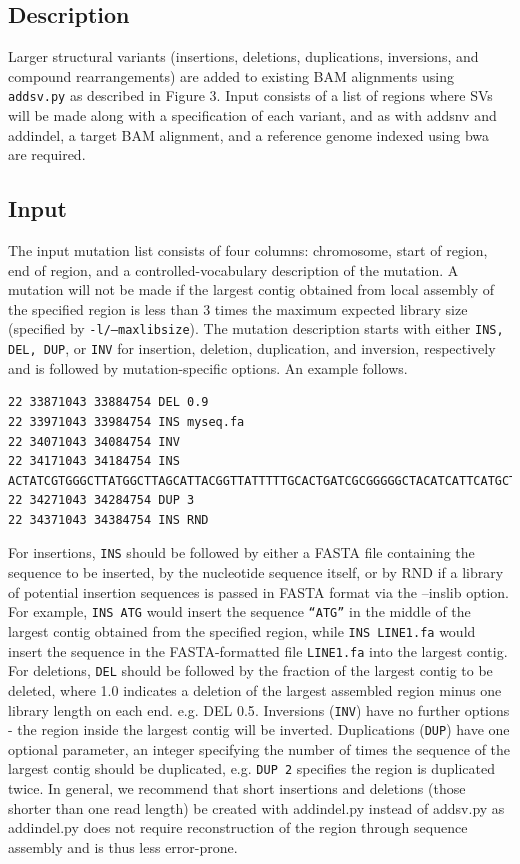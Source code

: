 \documentclass[letterpaper,11pt]{article}
\begin{document}
\subsection{Description}
   Larger structural variants (insertions, deletions, duplications, inversions, and compound rearrangements) are added to existing BAM alignments using \texttt{addsv.py} as described in Figure 3. Input consists of a list of regions where SVs will be made along with a specification of each variant, and as with addsnv and addindel, a target BAM alignment, and a reference genome indexed using bwa are required.

\subsection{Input}
    The input mutation list consists of four columns: chromosome, start of region, end of region, and a controlled-vocabulary description of the mutation. A mutation will not be made if the largest contig obtained from local assembly of the specified region is less than 3 times the maximum expected library size (specified by \texttt{-l/--maxlibsize}). The mutation description starts with either \texttt{INS, DEL, DUP}, or \texttt{INV} for insertion, deletion, duplication, and inversion, respectively and is followed by mutation-specific options. An example follows.

\begin{verbatim}
22 33871043 33884754 DEL 0.9
22 33971043 33984754 INS myseq.fa
22 34071043 34084754 INV
22 34171043 34184754 INS ACTATCGTGGGCTTATGGCTTAGCATTACGGTTATTTTTGCACTGATCGCGGGGGCTACATCATTCATGCTATTACTTGCGTATCGTA
22 34271043 34284754 DUP 3
22 34371043 34384754 INS RND
\end{verbatim}

    For insertions, \texttt{INS} should be followed by either a FASTA file containing the sequence to be inserted, by the nucleotide sequence itself, or by RND if a library of potential insertion sequences is passed in FASTA format via the --inslib option. For example, \texttt{INS ATG} would insert the sequence \texttt{``ATG''} in the middle of the largest contig obtained from the specified region, while \texttt{INS LINE1.fa} would insert the sequence in the FASTA-formatted file \texttt{LINE1.fa} into the largest contig. For deletions, \texttt{DEL} should be followed by the fraction of the largest contig to be deleted, where 1.0 indicates a deletion of the largest assembled region minus one library length on each end. e.g. {DEL 0.5}. Inversions (\texttt{INV}) have no further options - the region inside the largest contig will be inverted. Duplications (\texttt{DUP}) have one optional parameter, an integer specifying the number of times the sequence of the largest contig should be duplicated, e.g. \texttt{DUP 2} specifies the region is duplicated twice. In general, we recommend that short insertions and deletions (those shorter than one read length) be created with addindel.py instead of addsv.py as addindel.py does not require reconstruction of the region through sequence assembly and is thus less error-prone.
\end{document}
